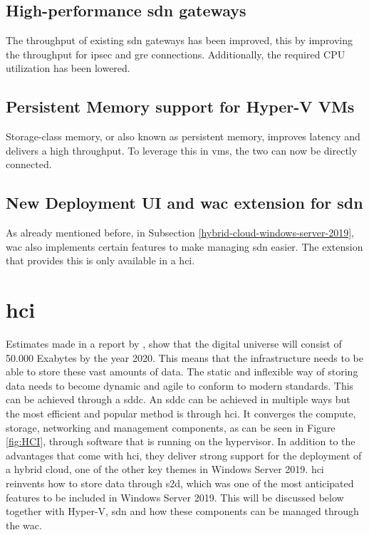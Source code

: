 \subsection*{High-performance \acrshort{sdn} gateways}
The throughput of existing \acrshort{sdn} gateways has been improved, this by improving the throughput for \acrfull{ipsec} and \acrfull{gre} connections. 
Additionally, the required CPU utilization has been lowered.
\subsection*{Persistent Memory support for Hyper-V VMs}
Storage-class memory, or also known as persistent memory, improves latency and delivers a high throughput. 
To leverage this in \acrshort{vm}s, the two can now be directly connected.
\subsection*{New Deployment UI and \acrlong{wac} extension for \acrshort{sdn}}
As already mentioned before, in Subsection \ref{hybrid-cloud-windows-server-2019}, \acrlong{wac} also implements certain features to make managing \acrshort{sdn} easier. 
The extension that provides this is only available in a \acrshort{hci}.

\clearpage

\section{\acrfull{hci}}
Estimates made in a report by \textcite{Gantz2012}, show that the digital universe will consist of 50.000 Exabytes by the year 2020. 
This means that the infrastructure needs to be able to store these vast amounts of data. 
The static and inflexible way of storing data needs to become dynamic and agile to conform to modern standards. 
This can be achieved through a \acrfull{sddc}. 
An \acrshort{sddc} can be achieved in multiple ways but the most efficient and popular method is through \acrshort{hci}. 
It converges the compute, storage, networking and management components, as can be seen in Figure \ref{fig:HCI}, through software that is running on the hypervisor. 
In addition to the advantages that come with \acrshort{hci}, they deliver strong support for the deployment of a hybrid cloud, one of the other key themes in Windows Server 2019. 
\acrshort{hci} reinvents how to store data through \acrshort{s2d}, which was one of the most anticipated features to be included in Windows Server 2019. 
This will be discussed below together with Hyper-V, \acrshort{sdn} and how these components can be managed through the \acrlong{wac}. \autocite{Haag2016}

